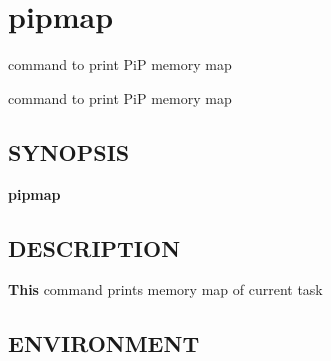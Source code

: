 \hypertarget{group__pipmap}{\section{pipmap}
\label{group__pipmap}
}


command to print Pi\-P memory map  


command to print Pi\-P memory map \hypertarget{group__piplnlibs_synopsis}{}\subsection{S\-Y\-N\-O\-P\-S\-I\-S}\label{group__piplnlibs_synopsis}
{\bfseries pipmap} \hypertarget{group__piplnlibs_description}{}\subsection{D\-E\-S\-C\-R\-I\-P\-T\-I\-O\-N}\label{group__piplnlibs_description}
{\bfseries This} command prints memory map of current task\hypertarget{group__piplnlibs_environment}{}\subsection{E\-N\-V\-I\-R\-O\-N\-M\-E\-N\-T}\label{group__piplnlibs_environment}
